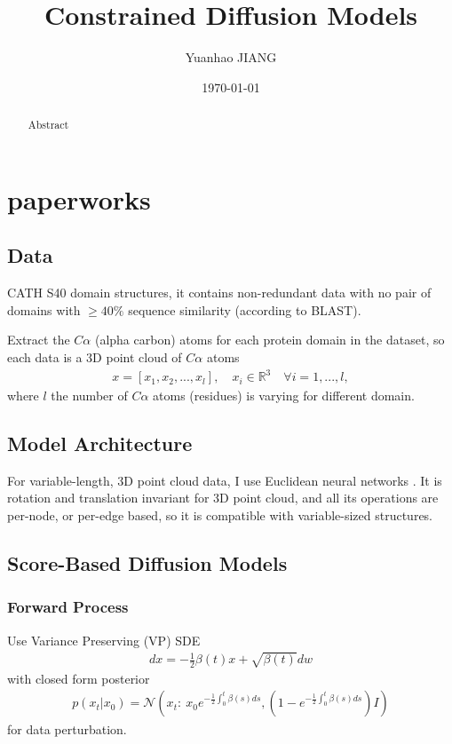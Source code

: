 \documentclass[12pt]{report}
\title{Constrained Diffusion Models}
\date{\today}
\author{Yuanhao JIANG}
\begin{document}
\maketitle

\begin{abstract}
    Abstract
\end{abstract}

\tableofcontents
{}
\newpage
{}

\chapter{paperworks}
\section{Data}
CATH S40 domain structures, it contains non-redundant data with no pair of domains with \(\geq 40\%\) sequence similarity (according to BLAST).

Extract the \(C\alpha\) (alpha carbon) atoms for each protein domain in the dataset, so each data is a 3D point cloud of \(C\alpha\) atoms
\begin{align*}
    x = \left[x_1,x_2,...,x_l\right],\quad x_i\in\mathbb{R}^3\quad\forall i=1,...,l,
\end{align*}
where \(l\) the number of \(C\alpha\) atoms (residues) is varying for different domain.
\section{Model Architecture}
For variable-length, 3D point cloud data, I use Euclidean neural networks \cite{thomasTensorFieldNetworks2018,weiler3DSteerableCNNs2018,kondorClebschGordanNetsFully2018}. It is rotation and translation invariant for 3D point cloud, and all its operations are per-node, or per-edge based, so it is compatible with variable-sized structures.
\section{Score-Based Diffusion Models}
\subsection{Forward Process}
Use Variance Preserving (VP) SDE \cite{song2020score}
\begin{align}\label{eq:VPSDE}
    dx=-\frac{1}{2}\beta(t)x+\sqrt{\beta(t)}dw
\end{align}
with closed form posterior
\begin{align*}
    p\left(x_t|x_0\right)=\mathcal{N}\left(x_t:\:x_0e^{-\frac{1}{2}\int_0^t\beta(s)ds},\left(1-e^{-\frac{1}{2}\int_0^t\beta(s)ds}\right)I\right)
\end{align*}
for data perturbation.
\end{document}
